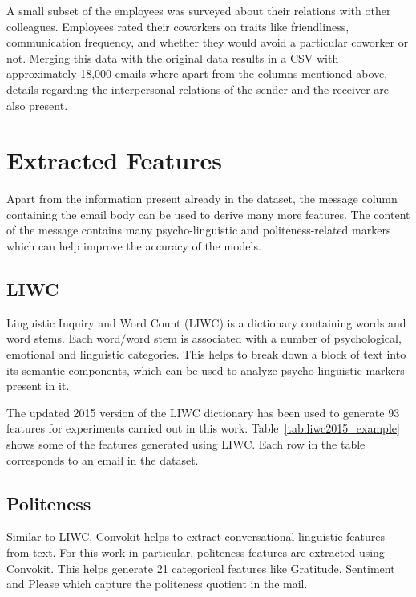 

A small subset of the employees was surveyed about their relations with other colleagues. Employees rated their coworkers on traits like friendliness, communication frequency, and whether they would avoid a particular coworker or not. Merging this data with the original data results in a CSV with approximately 18,000 emails where apart from the columns mentioned above, details regarding the interpersonal relations of the sender and the receiver are also present. 

\section{Extracted Features}

Apart from the information present already in the dataset, the message column containing the email body can be used to derive many more features. The content of the message contains many psycho-linguistic and politeness-related markers which can help improve the accuracy of the models.

\subsection{LIWC}

Linguistic Inquiry and Word Count (LIWC)\cite{pennebaker2007linguistic} is a dictionary containing words and word stems. Each word/word stem is associated with a number of psychological, emotional and linguistic categories. This helps to break down a block of text into its semantic components, which can be used to analyze psycho-linguistic markers present in it.


The updated 2015 version of the LIWC dictionary has been used to generate 93 features for experiments carried out in this work. Table~\ref{tab:liwc2015_example} shows some of the features generated using LIWC. Each row in the table corresponds to an email in the dataset. 


\subsection{Politeness}

Similar to LIWC, Convokit\cite{chang-etal-2020-convokit} helps to extract conversational linguistic features from text. For this work in particular, politeness features\cite{DanescuNiculescuMizil2013ACA} are extracted using Convokit. This helps generate 21 categorical features like Gratitude, Sentiment and Please which capture the politeness quotient in the mail.


